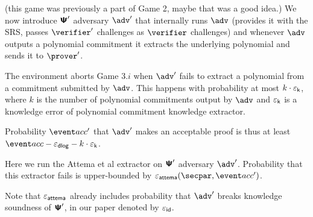 
 {(this game was previously a part of Game 2, maybe that was a good idea.)}
  We now introduce $\bm{\mathsf{\Psi}}'$ adversary $\adv'$ that internally runs $\adv$ (provides
  it with the SRS, passes $\verifier'$ challenges as $\verifier$ challenges) and whenever
  $\adv$ outputs a polynomial commitment it extracts the underlying polynomial and sends
  it to $\prover'$.

The environment aborts Game $3.i$ when $\adv'$ fails to extract a polynomial from
a commitment submitted by $\adv$. This happens with probability at most $k \cdot \varepsilon_{\mathsf{k}}$,
where $k$ is the number of polynomial commitments output by $\adv$ and $\varepsilon_{\mathsf{k}}$ is a
knowledge error of polynomial commitment knowledge extractor.

Probability $\accProb'$ that $\adv'$ makes an acceptable proof is thus at least
$\accProb - \epsdlog - k \cdot \epsk$.

 { Here we run the Attema et al extractor on $\bm{\mathsf{\Psi}}'$ adversary
  $\adv'$. Probability that this extractor fails is upper-bounded by
  $\epsa (\secpar, \accProb')$.

  Note that $\varepsilon_{\mathsf{attema}}$ already includes probability that $\adv'$ breaks knowledge soundness
  of $\bm{\mathsf{\Psi}}'$, in our paper denoted by $\varepsilon_{\mathsf{id}}$.  }



